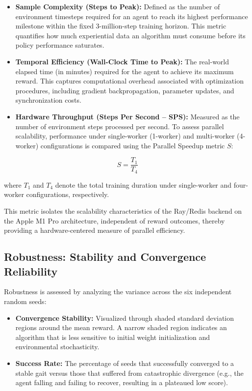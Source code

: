 \begin{itemize}

    \item \textbf{Sample Complexity (Steps to Peak):}  
    Defined as the number of environment timesteps required for an agent to reach its highest performance milestone within the fixed 3-million-step training horizon. This metric quantifies how much experiential data an algorithm must consume before its policy performance saturates.

    \item \textbf{Temporal Efficiency (Wall-Clock Time to Peak):}  
    The real-world elapsed time (in minutes) required for the agent to achieve its maximum reward. This captures computational overhead associated with optimization procedures, including gradient backpropagation, parameter updates, and synchronization costs.

    \item \textbf{Hardware Throughput (Steps Per Second – SPS):}  
    Measured as the number of environment steps processed per second. To assess parallel scalability, performance under single-worker (1-worker) and multi-worker (4-worker) configurations is compared using the Parallel Speedup metric $S$:

\end{itemize}

\begin{equation}
S = \frac{T_{1}}{T_{4}}
\label{eq:parallel_speedup}
\end{equation}

where $T_{1}$ and $T_{4}$ denote the total training duration under single-worker and four-worker configurations, respectively.

This metric isolates the scalability characteristics of the Ray/Redis backend on the Apple M1 Pro architecture, independent of reward outcomes, thereby providing a hardware-centered measure of parallel efficiency.


\subsection{Robustness: Stability and Convergence Reliability}

Robustness is assessed by analyzing the variance across the six independent random seeds:

\begin{itemize}
    \item \textbf{Convergence Stability:} Visualized through shaded standard deviation regions around the mean reward. A narrow shaded region indicates an algorithm that is less sensitive to initial weight initialization and environmental stochasticity.
    
    \item \textbf{Success Rate:} The percentage of seeds that successfully converged to a stable gait versus those that suffered from catastrophic divergence (e.g., the agent falling and failing to recover, resulting in a plateaued low score).
\end{itemize}

